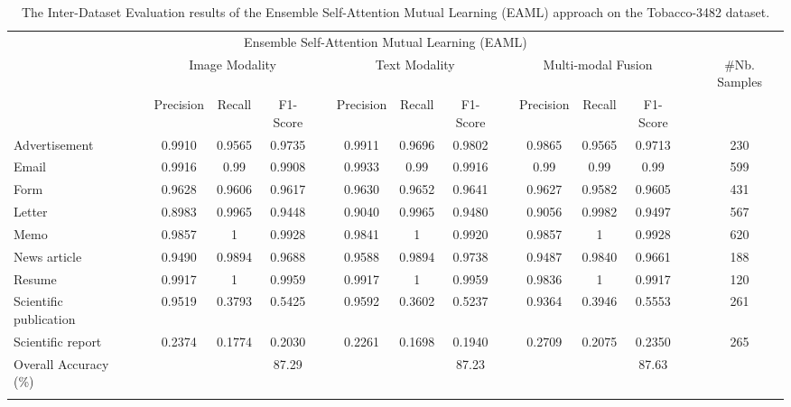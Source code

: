 \documentclass[twocolumn]{svjour3}
\begin{document}
\setlength\tabcolsep{3.8 pt}
\begin{table*}[tbh]
\small
\centering
\caption{The Inter-Dataset Evaluation results of the Ensemble Self-Attention Mutual Learning (EAML) approach on the Tobacco-3482 dataset.}
\resizebox{\textwidth}{!} {\begin{tabular}{lcccccccccccccc}
    \hline\noalign{\smallskip}
     \multicolumn{1}{c}{} && \multicolumn{10}{c}{Ensemble Self-Attention Mutual Learning (EAML)} \\
         \noalign{\smallskip}\hline\noalign{\smallskip}
         \multicolumn{1}{c}{Class Labels} && \multicolumn{3}{c}{Image Modality} && \multicolumn{3}{c}{Text Modality} && \multicolumn{3}{c}{Multi-modal Fusion} && \multicolumn{1}{c}{\#Nb. Samples} \\
         \noalign{\smallskip}\hline\noalign{\smallskip}
          && Precision & Recall & F1-Score &&  Precision & Recall & F1-Score && Precision & Recall & F1-Score\\
         \cmidrule{3-14}
         Advertisement 
         && 0.9910 & 0.9565 & 0.9735
         && 0.9911 & 0.9696 & 0.9802 
         && 0.9865 & 0.9565 & 0.9713 
         && 230 \\
         Email 
         && 0.9916 & 0.99 & 0.9908 
         && 0.9933 & 0.99 & 0.9916 
         && 0.99 & 0.99 & 0.99 
         && 599 \\
         Form 
         && 0.9628 & 0.9606 & 0.9617 
         && 0.9630 & 0.9652 & 0.9641 
         && 0.9627 & 0.9582 & 0.9605 
         && 431 \\
         Letter 
         && 0.8983 & 0.9965 & 0.9448
         && 0.9040 & 0.9965 & 0.9480 
         && 0.9056 & 0.9982 & 0.9497 
         && 567 \\
         Memo 
         && 0.9857 & 1 & 0.9928 
         && 0.9841 & 1 & 0.9920 
         && 0.9857 & 1 & 0.9928 
         && 620 \\
         News article 
         && 0.9490 & 0.9894 & 0.9688
         && 0.9588 & 0.9894 & 0.9738 
         && 0.9487 & 0.9840 & 0.9661 
         && 188 \\
         Resume 
         && 0.9917 & 1 & 0.9959 
         && 0.9917 & 1 & 0.9959 
         && 0.9836 & 1 & 0.9917 
         && 120 \\
         Scientific publication 
         && 0.9519 & 0.3793 & 0.5425
         && 0.9592 & 0.3602 & 0.5237 
         && 0.9364 & 0.3946 & 0.5553 
         && 261 \\
         Scientific report 
         && 0.2374 & 0.1774 & 0.2030
         && 0.2261 & 0.1698 & 0.1940 
         && 0.2709 & 0.2075 & 0.2350 
         && 265 \\
    \noalign{\smallskip}\hline\noalign{\smallskip}
        Overall Accuracy (\%) && & & 87.29 &&  &  & 87.23 &&  &  & 87.63 \\
    \noalign{\smallskip}\hline
    \end{tabular}}
    \label{tab:Evaluation of APML on tobacco}
\end{table*}
\end{document}
